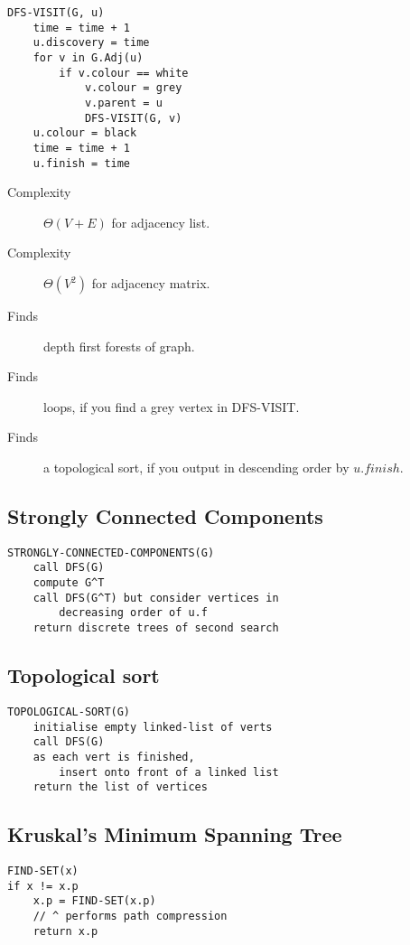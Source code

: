 \documentclass[landscape]{cheat}
\begin{document}
\begin{multicols*}{3}
\begin{lstlisting}
DFS-VISIT(G, u)
    time = time + 1
    u.discovery = time
    for v in G.Adj(u)
        if v.colour == white
            v.colour = grey
            v.parent = u
            DFS-VISIT(G, v)
    u.colour = black
    time = time + 1
    u.finish = time
\end{lstlisting}
\begin{description}
    \item[Complexity] $\Theta(V+E)$ for adjacency list.
    \item[Complexity] $\Theta(V^2)$ for adjacency matrix.
    \item[Finds] depth first forests of graph.
    \item[Finds] loops, if you find a grey vertex in DFS-VISIT.
    \item[Finds] a topological sort, if you output in descending order by $u.finish$.
\end{description}

\subsection{Strongly Connected Components}
\begin{lstlisting}
STRONGLY-CONNECTED-COMPONENTS(G)
    call DFS(G)
    compute G^T
    call DFS(G^T) but consider vertices in
        decreasing order of u.f
    return discrete trees of second search
\end{lstlisting}

\subsection{Topological sort}
\begin{lstlisting}
TOPOLOGICAL-SORT(G)
    initialise empty linked-list of verts
    call DFS(G)
    as each vert is finished, 
        insert onto front of a linked list
    return the list of vertices
\end{lstlisting}

\subsection{Kruskal's Minimum Spanning Tree}
\begin{lstlisting}
FIND-SET(x)
if x != x.p
    x.p = FIND-SET(x.p) 
    // ^ performs path compression
    return x.p


\end{lstlisting}
\end{multicols*}
\end{document}
